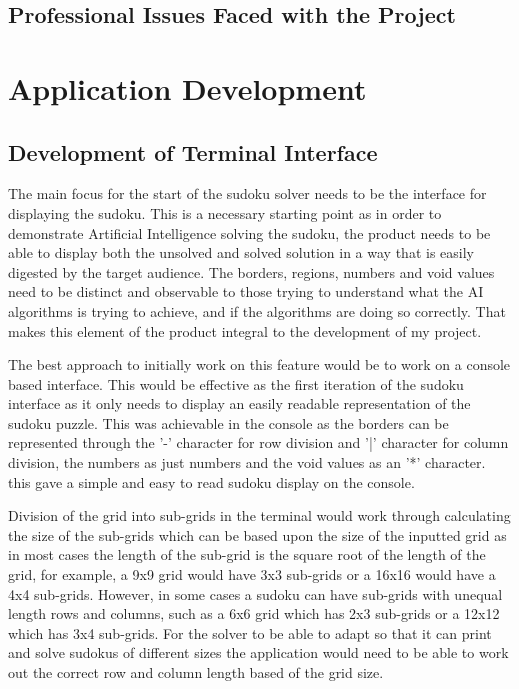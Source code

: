 \documentclass[]{final_report}
\begin{document}
\section{Professional Issues Faced with the Project}

\chapter{Application Development}
\section{Development of Terminal Interface}

The main focus for the start of the sudoku solver needs to be the interface for displaying the sudoku. This is a necessary starting point as in order to demonstrate Artificial Intelligence solving the sudoku, the product needs to be able to display both the unsolved and solved solution in a way that is easily digested by the target audience. The borders, regions, numbers and void values need to be distinct and observable to those trying to understand what the AI algorithms is trying to achieve, and if the algorithms are doing so correctly. That makes this element of the product integral to the development of my project. 

The best approach to initially work on this feature would be to work on a console based interface. This would be effective as the first iteration of the sudoku interface as it only needs to display an easily readable representation of the sudoku puzzle. This was achievable in the console as the borders can be represented through the '-' character for row division and '|' character for column division, the numbers as just numbers and the void values as an '*' character. this gave a simple and easy to read sudoku display on the console.

Division of the grid into sub-grids in the terminal would work through calculating the size of the sub-grids which can be based upon the size of the inputted grid as in most cases the length of the sub-grid is the square root of the length of the grid, for example, a 9x9 grid would have 3x3 sub-grids or a 16x16 would have a 4x4 sub-grids. However, in some cases a sudoku can have sub-grids with unequal length rows and columns, such as a 6x6 grid which has 2x3 sub-grids or a 12x12 which has 3x4 sub-grids. For the solver to be able to adapt so that it can print and solve sudokus of different sizes the application would need to be able to work out the correct row and column length based of the grid size. 
\end{document}
